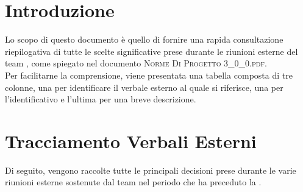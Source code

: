 \section{Introduzione}
Lo scopo di questo documento è quello di fornire una rapida consultazione riepilogativa di tutte le scelte significative prese durante le riunioni esterne del team \gruppo, come spiegato nel documento \textsc{Norme Di Progetto 3\_0\_0.pdf}.\\
Per facilitarne la comprensione, viene presentata una tabella composta di tre colonne, una per identificare il verbale esterno al quale si riferisce, una per l'identificativo e l'ultima per una breve descrizione.

\section{Tracciamento Verbali Esterni}
Di seguito, vengono raccolte tutte le principali decisioni prese durante le varie riunioni esterne sostenute dal team nel periodo che ha preceduto la \RQ.

